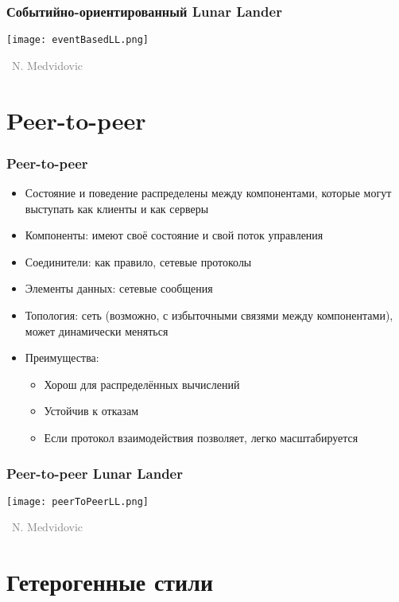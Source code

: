 \documentclass[xetex,mathserif,serif]{beamer}
\newcommand{\attribution}[1] {
	\vspace{-5mm}\begin{flushright}\begin{scriptsize}\textcolor{gray}{\textcopyright\, #1}\end{scriptsize}\end{flushright}
}
\begin{document}
	\begin{frame}
		\frametitle{Событийно-ориентированный Lunar Lander}
		\begin{center}
			\texttt{[image: eventBasedLL.png]}
			\attribution{N. Medvidovic}
		\end{center}
	\end{frame}

	\section{Peer-to-peer}

	\begin{frame}
		\frametitle{Peer-to-peer}
		\begin{itemize}
			\item Состояние и поведение распределены между компонентами, которые могут выступать как клиенты и как серверы
			\item Компоненты: имеют своё состояние и свой поток управления
			\item Соединители: как правило, сетевые протоколы
			\item Элементы данных: сетевые сообщения
			\item Топология: сеть (возможно, с избыточными связями между компонентами), может динамически меняться
			\item Преимущества:
			\begin{itemize}
				\item Хорош для распределённых вычислений
				\item Устойчив к отказам
				\item Если протокол взаимодействия позволяет, легко масштабируется
			\end{itemize}
		\end{itemize}
	\end{frame}

	\begin{frame}
		\frametitle{Peer-to-peer Lunar Lander}
		\begin{center}
			\texttt{[image: peerToPeerLL.png]}
			\attribution{N. Medvidovic}
		\end{center}
	\end{frame}

	\section{Гетерогенные стили}
\end{document}
